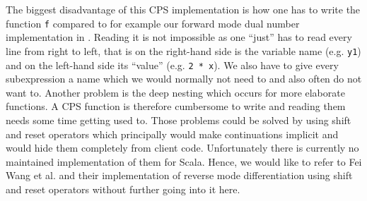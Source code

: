 The biggest disadvantage of this CPS implementation is how one has to write the function \lstinline{f} compared to for example our forward mode dual number implementation in . Reading it is not impossible as one ``just'' has to read every line from right to left, that is on the right-hand side is the variable name (e.g. \lstinline{y1}) and on the left-hand side its ``value'' (e.g. \lstinline{2 * x}). We also have to give every subexpression a name which we would normally not need to and also often do not want to. Another problem is the deep nesting which occurs for more elaborate functions. A CPS function is therefore cumbersome to write and reading them needs some time getting used to. Those problems could be solved by using shift and reset operators which principally would make continuations implicit and would hide them completely from client code. Unfortunately there is currently no maintained implementation of them for Scala. Hence, we would like to refer to Fei Wang et al. \cite{lantern} and their implementation of reverse mode differentiation using shift and reset operators without further going into it here.
